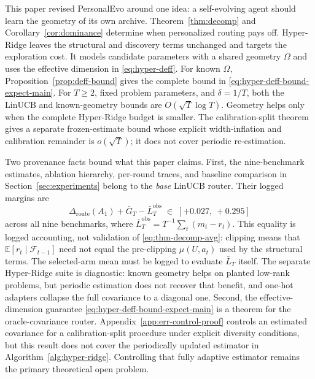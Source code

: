 \documentclass{article} %
\begin{document}
\label{sec:conclusion}

This paper revised PersonalEvo around one idea: a self-evolving agent should
learn the geometry of its own archive. Theorem~\ref{thm:decomp} and
Corollary~\ref{cor:dominance} determine when personalized routing pays off.
Hyper-Ridge leaves the structural and discovery terms unchanged and targets
the exploration cost. It models candidate parameters with a shared geometry
\(\Omega\) and uses the effective dimension in \eqref{eq:hyper-deff}.
For known \(\Omega\), Proposition~\ref{prop:deff-bound} gives the complete
bound in \eqref{eq:hyper-deff-bound-expect-main}. For \(T\ge2\), fixed problem
parameters, and \(\delta=1/T\), both the LinUCB and known-geometry bounds are
\(O(\sqrt{T}\log T)\). Geometry helps only when the complete Hyper-Ridge budget
is smaller. The calibration-split theorem gives a separate frozen-estimate
bound whose explicit width-inflation and calibration remainder is
\(o(\sqrt T)\); it does not cover periodic re-estimation.

Two provenance facts bound what this paper claims. First, the nine-benchmark estimates, ablation hierarchy, per-round traces, and baseline comparison in Section~\ref{sec:experiments} belong to the \emph{base} LinUCB router. Their logged margins are
\begin{equation}
\label{eq:conc-margins}
\Delta_{\mathrm{route}}(A_1) + \bar G_T - \bar L_T^{\mathrm{obs}}
\;\in\; [+0.027,\, +0.295]
\end{equation}
across all nine benchmarks, where
\(\bar L_T^{\mathrm{obs}}=T^{-1}\sum_t(m_t-r_t)\). This equality is logged
accounting, not validation of \eqref{eq:thm-decomp-avg}: clipping means that
\(\mathbb E[r_t\mid\mathcal F_{t-1}]\) need not equal the pre-clipping
\(\mu(U,a_t)\) used by the structural terms. The selected-arm mean must be
logged to evaluate \(\bar L_T\) itself. The separate Hyper-Ridge suite is
diagnostic: known geometry helps on planted low-rank problems, but periodic
estimation does not recover that benefit, and one-hot adapters collapse the
full covariance to a diagonal one. Second, the effective-dimension guarantee
\eqref{eq:hyper-deff-bound-expect-main} is a theorem for the oracle-covariance router.
Appendix~\ref{app:err-control-proof} controls an estimated covariance for a
calibration-split procedure under explicit diversity conditions, but this
result does not cover the periodically updated estimator in
Algorithm~\ref{alg:hyper-ridge}. Controlling that fully adaptive estimator
remains the primary theoretical open problem.
\end{document}
